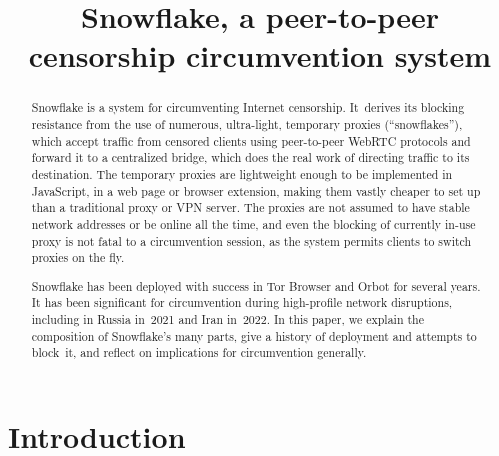 \documentclass[letterpaper,twocolumn]{article}
\begin{document}
\date{}

\title{Snowflake, a peer-to-peer censorship circumvention system}

\author{}

\maketitle

\begin{abstract}
Snowflake is a system for circumventing Internet censorship.
It~derives its blocking resistance from
the use of numerous, ultra-light, temporary proxies (``snowflakes''),
which accept traffic from censored clients using peer-to-peer WebRTC protocols
and forward it to a centralized bridge,
which does the real work of directing traffic to its destination.
The temporary proxies are lightweight enough to be implemented in JavaScript,
in a web page or browser extension,
making them vastly cheaper to set up than
a traditional proxy or VPN server.
The proxies are not assumed to have stable network addresses
or be online all the time,
and even the blocking of currently in-use proxy
is not fatal to a circumvention session,
as the system permits clients to switch proxies on the fly.


Snowflake has been deployed with success
in Tor Browser and Orbot for several years.
It has been significant for circumvention
during high-profile network disruptions,
including in Russia in~2021 and Iran in~2022.
In this paper, we explain the composition of Snowflake's many parts,
give a history of deployment and attempts to block~it,
and reflect on implications for circumvention generally.
\end{abstract}


\section{Introduction}
\label{sec:intro}
\end{document}
